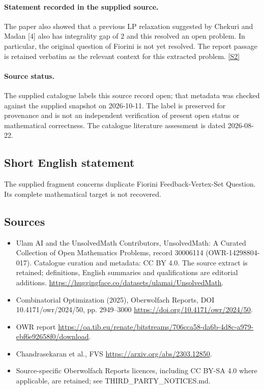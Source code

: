\documentclass[11pt]{article}
\newcommand{\sref}[2]{\hyperlink{source:#1:#2}{[S#2]}}
\begin{document}
\paragraph{Statement recorded in the supplied source.}
The paper also showed that a previous LP relaxation suggested by Chekuri and Madan [4] also has integrality gap of 2 and this resolved an open problem. In particular, the original question of Fiorini is not yet resolved. The report passage is retained verbatim as the relevant context for this extracted problem. \sref{30006114}{2}
\paragraph{Source status.}
The supplied catalogue labels this source record open; that metadata was checked against the supplied snapshot on 2026-10-11. The label is preserved for provenance and is not an independent verification of present open status or mathematical correctness. The catalogue literature assessment is dated 2026-08-22.
\subsection{Short English statement}
The supplied fragment concerns duplicate Fiorini Feedback-Vertex-Set Question. Its complete mathematical target is not recovered.
\subsection{Sources}
\begin{itemize}
\item[\hypertarget{source:30006114:1}{S1}] Ulam AI and the UnsolvedMath Contributors, UnsolvedMath: A Curated Collection of Open Mathematics Problems, record 30006114 (OWR-14298804-017). Catalogue curation and metadata: CC BY 4.0. The source extract is retained; definitions, English summaries and qualifications are editorial additions.
\url{https://huggingface.co/datasets/ulamai/UnsolvedMath}.
\item[\hypertarget{source:30006114:2}{S2}] Combinatorial Optimization (2025), Oberwolfach Reports, DOI 10.4171/owr/2024/50, pp. 2949--3000
\url{https://doi.org/10.4171/owr/2024/50}.
\item[\hypertarget{source:30006114:3}{S3}] OWR report
\url{https://oa.tib.eu/renate/bitstreams/706cca58-da6b-4d8c-a979-ebf6e92658f0/download}.
\item[\hypertarget{source:30006114:4}{S4}] Chandrasekaran et al., FVS
\url{https://arxiv.org/abs/2303.12850}.
\item Source-specific Oberwolfach Reports licences, including CC BY-SA 4.0 where applicable, are retained; see THIRD\_PARTY\_NOTICES.md.
\end{itemize}
\end{document}
